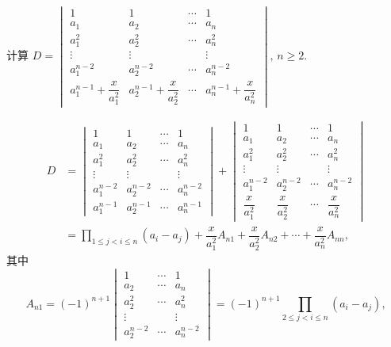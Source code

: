 \documentclass[../../main.tex]{subfiles}%
\begin{document}
\begin{example}
计算 \(D = \begin{vmatrix} 1 & 1 & \cdots & 1 \\ a_1 & a_2 & \cdots & a_n \\ a_1^2 & a_2^2 & \cdots & a_n^2 \\ \vdots & \vdots & & \vdots \\ a_1^{n - 2} & a_2^{n - 2} & \cdots & a_n^{n - 2} \\ a_1^{n - 1} + \dfrac{x}{a_1^2} & a_2^{n - 1} + \dfrac{x}{a_2^2} & \cdots & a_n^{n - 1} + \dfrac{x}{a_n^2} \end{vmatrix}, \, n \geqslant 2\).
\end{example}
\begin{solution}

\[
\begin{aligned}
D &= \begin{vmatrix} 1 & 1 & \cdots & 1 \\ a_1 & a_2 & \cdots & a_n \\ a_1^2 & a_2^2 & \cdots & a_n^2 \\ \vdots & \vdots & & \vdots \\ a_1^{n - 2} & a_2^{n - 2} & \cdots & a_n^{n - 2} \\ a_1^{n - 1} & a_2^{n - 1} & \cdots & a_n^{n - 1} \end{vmatrix} + \begin{vmatrix} 1 & 1 & \cdots & 1 \\ a_1 & a_2 & \cdots & a_n \\ a_1^2 & a_2^2 & \cdots & a_n^2 \\ \vdots & \vdots & & \vdots \\ a_1^{n - 2} & a_2^{n - 2} & \cdots & a_n^{n - 2} \\ \dfrac{x}{a_1^2} & \dfrac{x}{a_2^2} & \cdots & \dfrac{x}{a_n^2} \end{vmatrix} \\
&= \prod_{1 \leqslant j < i \leqslant n} (a_i - a_j) + \dfrac{x}{a_1^2} A_{n1} + \dfrac{x}{a_2^2} A_{n2} + \cdots + \dfrac{x}{a_n^2} A_{nn},
\end{aligned}
\]
其中
\[
A_{n1} = (-1)^{n + 1} \begin{vmatrix} 1 & \cdots & 1 \\ a_2 & \cdots & a_n \\ a_2^2 & \cdots & a_n^2 \\ \vdots & & \vdots \\ a_2^{n - 2} & \cdots & a_n^{n - 2} \end{vmatrix} = (-1)^{n + 1} \prod_{2 \leqslant j < i \leqslant n} (a_i - a_j),
\]
\end{solution}
\end{document}

